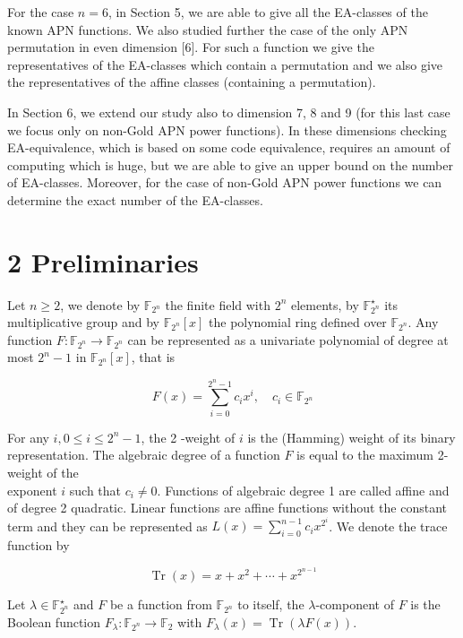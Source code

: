 \documentclass[10pt]{article}
\begin{document}
For the case $n=6$, in Section 5, we are able to give all the EA-classes of the known APN functions. We also studied further the case of the only APN permutation in even dimension [6]. For such a function we give the representatives of the EA-classes which contain a permutation and we also give the representatives of the affine classes (containing a permutation).

In Section 6, we extend our study also to dimension 7, 8 and 9 (for this last case we focus only on non-Gold APN power functions). In these dimensions checking EA-equivalence, which is based on some code equivalence, requires an amount of computing which is huge, but we are able to give an upper bound on the number of EA-classes. Moreover, for the case of non-Gold APN power functions we can determine the exact number of the EA-classes.

\section*{2 Preliminaries}
Let $n \geq 2$, we denote by $\mathbb{F}_{2^{n}}$ the finite field with $2^{n}$ elements, by $\mathbb{F}_{2^{n}}^{\star}$ its multiplicative group and by $\mathbb{F}_{2^{n}}[x]$ the polynomial ring defined over $\mathbb{F}_{2^{n}}$. Any function $F: \mathbb{F}_{2^{n}} \rightarrow \mathbb{F}_{2^{n}}$ can be represented as a univariate polynomial of degree at most $2^{n}-1$ in $\mathbb{F}_{2^{n}}[x]$, that is

$$
F(x)=\sum_{i=0}^{2^{n}-1} c_{i} x^{i}, \quad c_{i} \in \mathbb{F}_{2^{n}}
$$

For any $i, 0 \leq i \leq 2^{n}-1$, the 2 -weight of $i$ is the (Hamming) weight of its binary representation. The algebraic degree of a function $F$ is equal to the maximum 2-weight of the\\
exponent $i$ such that $c_{i} \neq 0$. Functions of algebraic degree 1 are called affine and of degree 2 quadratic. Linear functions are affine functions without the constant term and they can be represented as $L(x)=\sum_{i=0}^{n-1} c_{i} x^{2^{i}}$. We denote the trace function by

$$
\operatorname{Tr}(x)=x+x^{2}+\cdots+x^{2^{n-1}}
$$

Let $\lambda \in \mathbb{F}_{2^{n}}^{\star}$ and $F$ be a function from $\mathbb{F}_{2^{n}}$ to itself, the $\lambda$-component of $F$ is the Boolean function $F_{\lambda}: \mathbb{F}_{2^{n}} \rightarrow \mathbb{F}_{2}$ with $F_{\lambda}(x)=\operatorname{Tr}(\lambda F(x))$.
\end{document}
